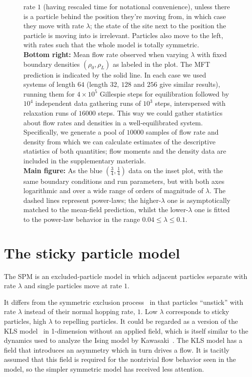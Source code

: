 \documentclass[
reprint, amsmath,amssymb,
]{revtex4-1}
\begin{document}
\begin{figure}[h!]
{  rate $1$ (having rescaled time for notational convenience), unless
  there is a particle behind the position they're moving from, in
  which case they move with rate $\lambda$; the state of the site next
  to the position the particle is moving into is irrelevant.
  Particles also move to the left, with rates such that the whole
  model is totally symmetric.\\ \textbf{Bottom right:} Mean flow rate
  observed when varying $\lambda$ with fixed boundary densities
  $(\rho_0, \rho_L)$ as labeled in the plot.  The MFT
  prediction is indicated by the solid line.  In each case we used
  systems of length $64$ (length $32$, $128$ and $256$ give similar
  results), running them for $4\times10^5$ Gillespie steps for
  equilibration followed by $10^4$ independent data gathering runs of
  $10^3$ steps, interspersed with relaxation runs of $16000$
  steps. This way we could gather statistics about flow rates and
  densities in a well-equilibrated system. Specifically, we generate a
  pool of $10000$ samples of flow rate and density from which we can
  calculate estimates of the descriptive statistics of both
  quantities; flow moments and the density data are included in the
  supplementary materials.\\ \textbf{Main figure:} As the blue $\left(
  \frac{3}{4} , \frac{1}{4} \right)$ data on the inset plot, with the
  same boundary conditions and run parameters, but with both axes
  logarithmic and over a wide range of orders of magnitude of
  $\lambda$.  The dashed lines represent power-laws; the
  higher-$\lambda$ one is asymptotically matched to the mean-field
  prediction, whilst the lower-$\lambda$ one is fitted to the
  power-law behavior in the range $0.04 \le \lambda \le 0.1$.
\vspace{1em}}
\end{figure}
\fi



\section{The sticky particle model} \label{sec:modelDefn}

The SPM is an excluded-particle model in which adjacent particles
separate with rate $\lambda$ and single particles move at rate $1$.


It differs from the symmetric exclusion
process~\cite{sugden2007dynamically, Kollmann2003, Lin2005,
  Hegde2014,Krapivsky2014, Imamura2017} in that particles ``unstick''
with rate $\lambda$ instead of their normal hopping rate, $1$.  Low
$\lambda$ corresponds to sticky particles, high $\lambda$ to repelling
particles.
It could be regarded as a version of the KLS model~\cite{Katz1984,
  Zia2010, Kafri2003} in 1-dimension without an applied field, which
is itself similar to the dynamics used to analyze the Ising model by
Kawasaki~\cite{PhysRev.145.224}.  The KLS model has a field that
introduces an asymmetry which in turn drives a flow.  It is tacitly assumed
that this field is required for the nontrivial flow behavior seen in
the model, so the simpler symmetric model has received less attention.
\end{document}
